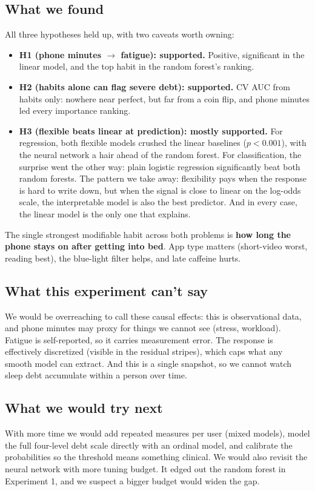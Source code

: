 \documentclass[10pt]{article}
\begin{document}
\subsection{What we found}
All three hypotheses held up, with two caveats worth owning:
\begin{itemize}
  \item \textbf{H1 (phone minutes $\rightarrow$ fatigue): supported.} Positive, significant in the linear model, and the top habit in the random forest's ranking.
  \item \textbf{H2 (habits alone can flag severe debt): supported.} CV AUC \cvAucGlm{} from habits only: nowhere near perfect, but far from a coin flip, and phone minutes led every importance ranking.
  \item \textbf{H3 (flexible beats linear at prediction): mostly supported.} For regression, both flexible models crushed the linear baselines ($p < 0.001$), with the neural network a hair ahead of the random forest. For classification, the surprise went the other way: plain logistic regression significantly beat both random forests. The pattern we take away: flexibility pays when the response is hard to write down, but when the signal is close to linear on the log-odds scale, the interpretable model is also the best predictor. And in every case, the linear model is the only one that explains.
\end{itemize}
The single strongest modifiable habit across both problems is \textbf{how long the phone stays on after getting into bed}. App type matters (short-video worst, reading best), the blue-light filter helps, and late caffeine hurts.

\subsection{What this experiment can't say}
We would be overreaching to call these causal effects: this is observational data, and phone minutes may proxy for things we cannot see (stress, workload). Fatigue is self-reported, so it carries measurement error. The response is effectively discretized (visible in the residual stripes), which caps what any smooth model can extract. And this is a single snapshot, so we cannot watch sleep debt accumulate within a person over time.

\subsection{What we would try next}
With more time we would add repeated measures per user (mixed models), model the full four-level debt scale directly with an ordinal model, and calibrate the probabilities so the threshold means something clinical. We would also revisit the neural network with more tuning budget. It edged out the random forest in Experiment 1, and we suspect a bigger budget would widen the gap.
\end{document}
